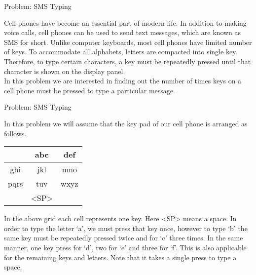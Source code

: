 \documentclass[12pt,t]{beamer}
\begin{document}
\begin{frame}{Problem: SMS Typing}

\vspace{20pt}

{\small
   Cell phones have become an essential part of modern life. In addition to
making voice calls, cell phones can be used to send text messages, which
are known as SMS for short. Unlike computer keyboards, most cell phones
have limited number of keys. To accommodate all alphabets, letters are
compacted into single key. Therefore, to type certain characters, a key
must be repeatedly pressed until that character is shown on the display
panel.\\
\vspace{10pt}
In this problem we are interested in finding out the number of times keys on a cell phone must be
pressed to type a particular message.
}
\end{frame}


\begin{frame}{Problem: SMS Typing}

\vspace{10pt}

{
    \small
In this problem we will assume that the key pad of our cell phone is arranged as follows.

\begin{center}
    \begin{tabular}{|c|c|c|}
        \hline
         & abc & def \\
        \hline
        ghi & jkl & mno \\
        \hline
        pqrs & tuv & wxyz \\
        \hline
         & <SP> & \\
        \hline
    \end{tabular}
\end{center}

In the above grid each cell represents one key. Here <SP> means a space. In order to type the letter
‘a’, we must press that key once, however to type ‘b’ the same key must be repeatedly pressed twice
and for ‘c’ three times. In the same manner, one key press for ‘d’, two for ‘e’ and three for ‘f’. This is
also applicable for the remaining keys and letters. Note that it takes a single press to type a space.
}

\end{frame}
\end{document}

